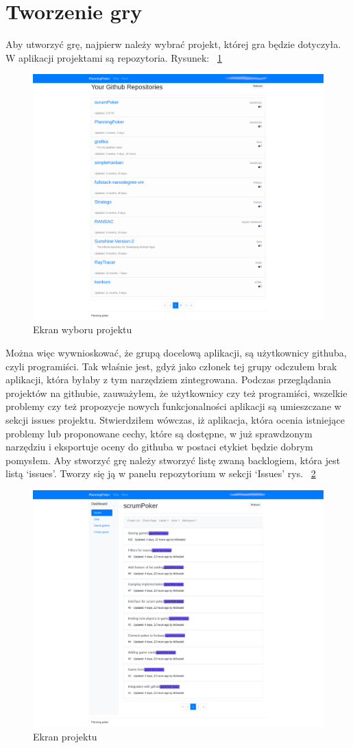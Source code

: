 \section{Tworzenie gry}
Aby utworzyć grę, najpierw należy wybrać projekt, której gra będzie dotyczyła.
W aplikacji projektami są repozytoria. Rysunek: 
~\ref{rys:projekty}
\begin{figure}
	\centering\includegraphics[width=.7\textwidth]{img/repositories}
	\caption{Ekran wyboru projektu}\label{rys:projekty}%
\end{figure}
Można więc wywnioskować, że grupą docelową aplikacji, są użytkownicy githuba, czyli programiści.
Tak właśnie jest, gdyż jako członek tej grupy odczułem brak aplikacji, która byłaby z tym narzędziem zintegrowana.
Podczas przeglądania projektów na githubie, zauważyłem, że użytkownicy czy też programiści,
wszelkie problemy czy też propozycje nowych funkcjonalności aplikacji są umieszczane w sekcji issues projektu.
Stwierdziłem wówczas, iż aplikacja, która ocenia istniejące problemy lub proponowane cechy, które są dostępne,
w już sprawdzonym narzędziu i eksportuje oceny do githuba w postaci etykiet będzie dobrym pomysłem.
Aby stworzyć grę należy stworzyć listę zwaną backlogiem, która jest listą `issues'.
Tworzy się ją w panelu repozytorium w sekcji `Issues' rys.
~\ref{rys:issues} 
\begin{figure}
	\centering\includegraphics[width=.7\textwidth]{img/issues}
	\caption{Ekran projektu}\label{rys:issues}%
\end{figure}
